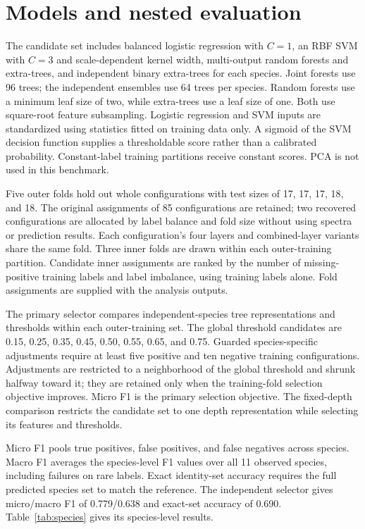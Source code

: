 \documentclass[11pt,a4paper]{article}
\begin{document}
\section{Models and nested evaluation}
The candidate set includes balanced logistic regression with $C=1$, an RBF SVM with $C=3$ and scale-dependent kernel width, multi-output random forests and extra-trees, and independent binary extra-trees for each species.\cite{geurts2006} Joint forests use 96 trees; the independent ensembles use 64 trees per species. Random forests use a minimum leaf size of two, while extra-trees use a leaf size of one. Both use square-root feature subsampling. Logistic regression and SVM inputs are standardized using statistics fitted on training data only. A sigmoid of the SVM decision function supplies a thresholdable score rather than a calibrated probability. Constant-label training partitions receive constant scores. PCA is not used in this benchmark.

Five outer folds hold out whole configurations with test sizes of 17, 17, 17, 18, and 18. The original assignments of 85 configurations are retained; two recovered configurations are allocated by label balance and fold size without using spectra or prediction results. Each configuration's four layers and combined-layer variants share the same fold. Three inner folds are drawn within each outer-training partition. Candidate inner assignments are ranked by the number of missing-positive training labels and label imbalance, using training labels alone. Fold assignments are supplied with the analysis outputs.

The primary selector compares independent-species tree representations and thresholds within each outer-training set. The global threshold candidates are 0.15, 0.25, 0.35, 0.45, 0.50, 0.55, 0.65, and 0.75. Guarded species-specific adjustments require at least five positive and ten negative training configurations. Adjustments are restricted to a neighborhood of the global threshold and shrunk halfway toward it; they are retained only when the training-fold selection objective improves. Micro F1 is the primary selection objective. The fixed-depth comparison restricts the candidate set to one depth representation while selecting its features and thresholds.

Micro F1 pools true positives, false positives, and false negatives across species. Macro F1 averages the species-level F1 values over all 11 observed species, including failures on rare labels. Exact identity-set accuracy requires the full predicted species set to match the reference. The independent selector gives micro/macro F1 of 0.779/0.638 and exact-set accuracy of 0.690. Table~\ref{tab:species} gives its species-level results.
\end{document}
